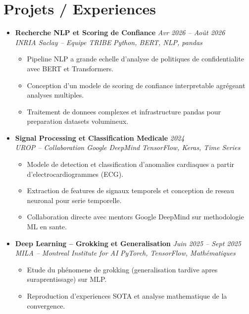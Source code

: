 \documentclass[a4paper,11pt]{article}
\begin{document}
\section{Projets / Experiences}
\begin{itemize}[leftmargin=*, label={-}]

\item \textbf{Recherche NLP et Scoring de Confiance} \hfill \textit{Avr 2026 -- Ao\^ut 2026} \\
\textit{INRIA Saclay -- Equipe TRIBE} \hfill \textit{Python, BERT, NLP, pandas}
\vspace{-2pt}
    \begin{itemize}[leftmargin=0.4cm, nosep, label=\tiny$\bullet$]
        \item \small{Pipeline NLP a grande echelle d'analyse de politiques de confidentialite avec BERT et Transformers.}
        \item \small{Conception d'un modele de scoring de confiance interpretable agr\'egeant analyses multiples.}
        \item \small{Traitement de donnees complexes et infrastructure pandas pour preparation datasets volumineux.}
    \end{itemize}
\vspace{3pt}

\item \textbf{Signal Processing et Classification Medicale} \hfill \textit{2024} \\
\textit{UROP -- Collaboration Google DeepMind} \hfill \textit{TensorFlow, Keras, Time Series}
\vspace{-2pt}
    \begin{itemize}[leftmargin=0.4cm, nosep, label=\tiny$\bullet$]
        \item \small{Modele de detection et classification d'anomalies cardiaques a partir d'electrocardiogrammes (ECG).}
        \item \small{Extraction de features de signaux temporels et conception de reseau neuronal pour serie temporelle.}
        \item \small{Collaboration directe avec mentors Google DeepMind sur methodologie ML en sante.}
    \end{itemize}
\vspace{3pt}

\item \textbf{Deep Learning -- Grokking et Generalisation} \hfill \textit{Juin 2025 -- Sept 2025} \\
\textit{MILA -- Montreal Institute for AI} \hfill \textit{PyTorch, TensorFlow, Math\'ematiques}
\vspace{-2pt}
    \begin{itemize}[leftmargin=0.4cm, nosep, label=\tiny$\bullet$]
        \item \small{Etude du ph\'enomene de grokking (generalisation tardive apres suraprentissage) sur MLP.}
        \item \small{Reproduction d'experiences SOTA et analyse mathematique de la convergence.}
    \end{itemize}
\vspace{3pt}


\end{itemize}
\end{document}
